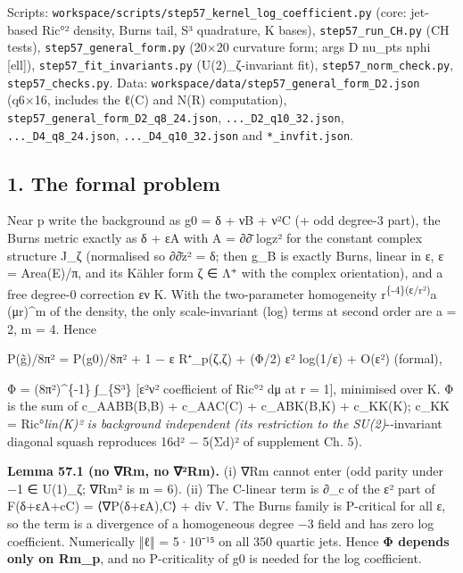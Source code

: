 \documentclass[
  10pt,
]{report}
\begin{document}
Scripts: \texttt{workspace/scripts/step57\_kernel\_log\_coefficient.py}
(core: jet-based \textbar Ric°\textbar² density, Burns tail, S³
quadrature, K bases), \texttt{step57\_run\_CH.py} (CH tests),
\texttt{step57\_general\_form.py} (20×20 curvature form; args D nu\_pts
nphi {[}ell{]}), \texttt{step57\_fit\_invariants.py} (U(2)\_ζ-invariant
fit), \texttt{step57\_norm\_check.py}, \texttt{step57\_checks.py}. Data:
\texttt{workspace/data/step57\_general\_form\_D2.json} (q6×16, includes
the ℓ(C) and N(R) computation),
\texttt{step57\_general\_form\_D2\_q8\_24.json},
\texttt{...\_D2\_q10\_32.json}, \texttt{...\_D4\_q8\_24.json},
\texttt{...\_D4\_q10\_32.json} and \texttt{*\_invfit.json}.

\hypertarget{the-formal-problem}{%
\subsection{1. The formal problem}\label{the-formal-problem}}

Near p write the background as g0 = δ + νB + ν²C (+ odd degree-3 part),
the Burns metric exactly as δ + εA with A = ∂∂̄ log\textbar z\textbar²
for the constant complex structure J\_ζ (normalised so
∂∂̄\textbar z\textbar² = δ; then g\_B is exactly Burns, linear in ε, ε =
Area(E)/π, and its Kähler form ζ ∈ Λ⁺ with the complex orientation), and
a free degree-0 correction εν K. With the two-parameter homogeneity
r\textsuperscript{\{-4\}(ε/r²)}a (μr)\^{}m of the density, the only
scale-invariant (log) terms at second order are a = 2, m = 4. Hence

P(g̃)/8π² = P(g0)/8π² + 1 − ε R⁺\_p(ζ,ζ) + (Φ/2) ε² log(1/ε) + O(ε²)
(formal),

Φ = (8π²)\^{}\{-1\} ∫\_\{S³\} {[}ε²ν² coefficient of
\textbar Ric°\textbar² dμ at r = 1{]}, minimised over K. Φ is the sum of
c\_AABB(B,B) + c\_AAC(C) + c\_ABK(B,K) + c\_KK(K); c\_KK =
\textbar Ric°\emph{lin(K)\textbar² is background independent (its
restriction to the SU(2)}-‑invariant diagonal squash reproduces
16\textbar d\textbar² − 5(Σd)² of supplement Ch. 5).

\textbf{Lemma 57.1 (no ∇Rm, no ∇²Rm).} (i) ∇Rm cannot enter (odd parity
under −1 ∈ U(1)\_ζ; ∇Rm² is m = 6). (ii) The C-linear term is ∂\_c of
the ε² part of F(δ+εA+cC) = ⟨∇P(δ+εA),C⟩ + div V. The Burns family is
P-critical for all ε, so the term is a divergence of a homogeneous
degree −3 field and has zero log coefficient. Numerically ‖ℓ‖ = 5·10⁻¹⁵
on all 350 quartic jets. Hence \textbf{Φ depends only on Rm\_p}, and no
P-criticality of g0 is needed for the log coefficient.
\end{document}
